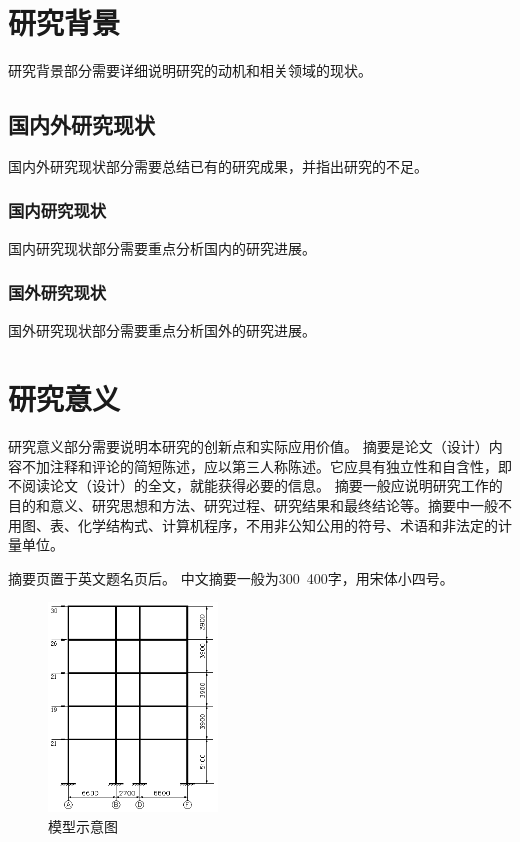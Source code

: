 \documentclass{document}
\begin{document}
\begin{cqucontents}

\end{cqucontents}



\pagestyle{essaystyle}


\section{研究背景}
研究背景部分需要详细说明研究的动机和相关领域的现状。

\subsection{国内外研究现状}
国内外研究现状部分需要总结已有的研究成果，并指出研究的不足。

\subsubsection{国内研究现状}
国内研究现状部分需要重点分析国内的研究进展。

\subsubsection{国外研究现状}
国外研究现状部分需要重点分析国外的研究进展。

\section{研究意义}
研究意义部分需要说明本研究的创新点和实际应用价值。
摘要是论文（设计）内容不加注释和评论的简短陈述，应以第三人称陈述。它应具有独立性和自含性，即不阅读论文（设计）的全文，就能获得必要的信息。
摘要一般应说明研究工作的目的和意义、研究思想和方法、研究过程、研究结果和最终结论等。摘要中一般不用图、表、化学结构式、计算机程序，不用非公知公用的符号、术语和非法定的计量单位。\cite{YXXY20250307001}%


摘要页置于英文题名页后。 
中文摘要一般为300~400字，用宋体小四号。
\begin{figure}[htbp]
    \centering
    \includegraphics[width=0.4\textwidth]{assets/images/image.png}
    \caption{模型示意图}
    \label{fig:model}%
\end{figure}
\end{document}
